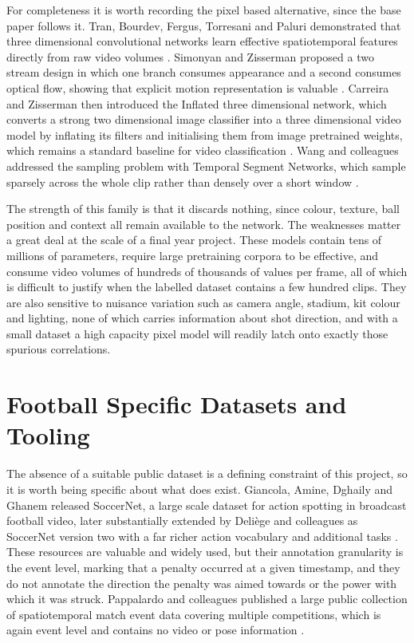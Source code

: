 For completeness it is worth recording the pixel based alternative, since the base paper follows it. Tran, Bourdev, Fergus, Torresani and Paluri demonstrated that three dimensional convolutional networks learn effective spatiotemporal features directly from raw video volumes \cite{tran2015}. Simonyan and Zisserman proposed a two stream design in which one branch consumes appearance and a second consumes optical flow, showing that explicit motion representation is valuable \cite{simonyan2014}. Carreira and Zisserman then introduced the Inflated three dimensional network, which converts a strong two dimensional image classifier into a three dimensional video model by inflating its filters and initialising them from image pretrained weights, which remains a standard baseline for video classification \cite{carreira2017}. Wang and colleagues addressed the sampling problem with Temporal Segment Networks, which sample sparsely across the whole clip rather than densely over a short window \cite{wang2016}.

The strength of this family is that it discards nothing, since colour, texture, ball position and context all remain available to the network. The weaknesses matter a great deal at the scale of a final year project. These models contain tens of millions of parameters, require large pretraining corpora to be effective, and consume video volumes of hundreds of thousands of values per frame, all of which is difficult to justify when the labelled dataset contains a few hundred clips. They are also sensitive to nuisance variation such as camera angle, stadium, kit colour and lighting, none of which carries information about shot direction, and with a small dataset a high capacity pixel model will readily latch onto exactly those spurious correlations.

\section{Football Specific Datasets and Tooling}

The absence of a suitable public dataset is a defining constraint of this project, so it is worth being specific about what does exist. Giancola, Amine, Dghaily and Ghanem released SoccerNet, a large scale dataset for action spotting in broadcast football video, later substantially extended by Deliège and colleagues as SoccerNet version two with a far richer action vocabulary and additional tasks \cite{giancola2018,deliege2021}. These resources are valuable and widely used, but their annotation granularity is the event level, marking that a penalty occurred at a given timestamp, and they do not annotate the direction the penalty was aimed towards or the power with which it was struck. Pappalardo and colleagues published a large public collection of spatiotemporal match event data covering multiple competitions, which is again event level and contains no video or pose information \cite{pappalardo2019}.

